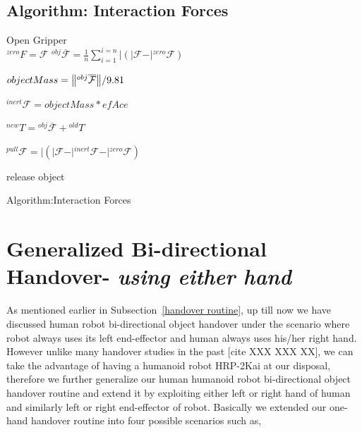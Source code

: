 \documentclass[a4paper, 12pt, oneside]{Thesis}  %
\begin{document}
\subsection{Algorithm: Interaction Forces}
\begin{algorithm}[H]\label{interaction forces}
	\DontPrintSemicolon
	\SetNoFillComment
	
	
	{
		{
		    Open Gripper\\
			$\mathcal{}^{zero}{F}= \mathcal{F}$
		}
		${}^{obj}\overline{\mathcal{F}} = \frac{1}{n}\sum_{i=1}^{i=n} \vert{ (\vert{\mathcal{F}} - \vert{{}^{zero}\mathcal{F}}) }$
		
		$objectMass = \norm{{}^{obj}\overline{\mathcal{F}}}/9.81 $
		
		${}^{inert}\mathcal{F} = objectMass * efAce$ 
		
		${}^{new}T = {}^{obj}\overline{\mathcal{F}} + {}^{old}T$
		
		{	
			${}^{pull}\mathcal{F} = \vert{(\vert\mathcal{{F}} - \vert{}^{inert}\mathcal{{F}} - \vert{}^{zero}\mathcal{{F}}) }$
			
			{
				\textrm{release object}
			}
		}
	}
	\caption{Algorithm:Interaction Forces}
\end{algorithm}




\clearpage

\section{Generalized Bi-directional Handover- \textit{using either hand}}\label{both hands individual}

As mentioned earlier in Subsection~\ref{handover routine}, up till now we have discussed human robot bi-directional object handover under the scenario where robot always uses its left end-effector and human always uses his/her right hand. However unlike many handover studies in the past [cite XXX XXX XX], we can take the advantage of having a humanoid robot HRP-2Kai at our disposal, therefore we further generalize our human humanoid robot bi-directional object handover routine and extend it by exploiting either left or right hand of human and similarly left or right end-effector of robot. Basically we extended our one-hand handover routine into four possible scenarios such as,
\end{document}
